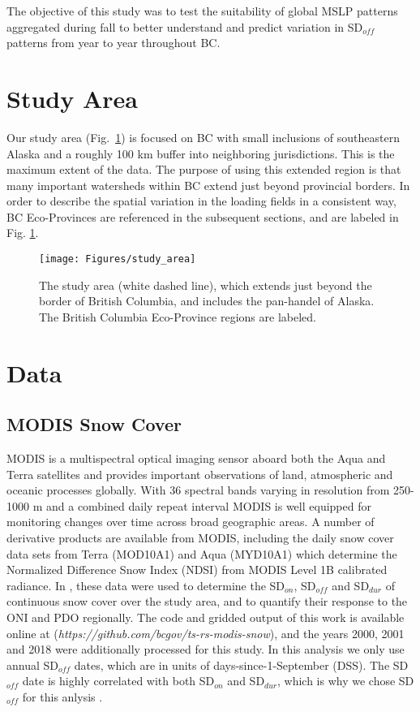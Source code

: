 \documentclass{tATO2e}
\newcommand{\sdoff}{SD$_{off}$}
\newcommand{\sdon}{SD$_{on}$}
\newcommand{\sddur}{SD$_{dur}$}
\begin{document}
\par
The objective of this study was to test the suitability of global MSLP patterns aggregated during fall to better understand and predict variation in \sdoff{} patterns from year to year throughout BC. 


\section{Study Area}
Our study area (Fig.~\ref{study-area}) is focused on BC with small inclusions of southeastern Alaska and a roughly 100 km buffer into neighboring jurisdictions. This is the maximum extent of the \cite{Bevington2019} data. The purpose of using this extended region is that many important watersheds within BC extend just beyond provincial borders. In order to describe the spatial variation in the loading fields in a consistent way, BC Eco-Provinces are referenced in the subsequent sections, and are labeled in Fig. \ref{study-area}.

\begin{figure}
	\begin{center}
		\texttt{[image: Figures/study\_area]}
		\caption{The study area (white dashed line), which extends just beyond the border of British Columbia, and includes the pan-handel of Alaska. The British Columbia Eco-Province regions are labeled.}
		\label{study-area}
	\end{center}
\end{figure}

\section{Data}
\subsection{MODIS Snow Cover}
MODIS is a multispectral optical imaging sensor aboard both the Aqua and Terra satellites and provides important observations of land, atmospheric and oceanic processes globally. With 36 spectral bands varying in resolution from 250-1000 m and a combined daily repeat interval MODIS is well equipped for monitoring changes over time across broad geographic areas. A number of derivative products are available from MODIS, including the daily snow cover data sets from Terra (MOD10A1) and Aqua (MYD10A1) which determine the Normalized Difference Snow Index (NDSI) \citep{Hall2011} from MODIS Level 1B calibrated radiance. In \cite{Bevington2019}, these data were used to determine the \sdon{}, \sdoff{} and \sddur{} of continuous snow cover over the study area, and to quantify their response to the ONI and PDO regionally. The code and gridded output of this work is available online at (\textit{https://github.com/bcgov/ts-rs-modis-snow}), and the years 2000, 2001 and 2018 were additionally processed for this study. In this analysis we only use annual \sdoff{} dates, which are in units of days-since-1-September (DSS). The \sdoff{} date is highly correlated with both \sdon{} and \sddur{}, which is why we chose \sdoff{} for this anlysis \citep{Bevington2019}.
\end{document}
